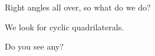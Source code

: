 


Right angles all over, so what do we do?













We look for cyclic quadrilaterals.

Do you see any?






